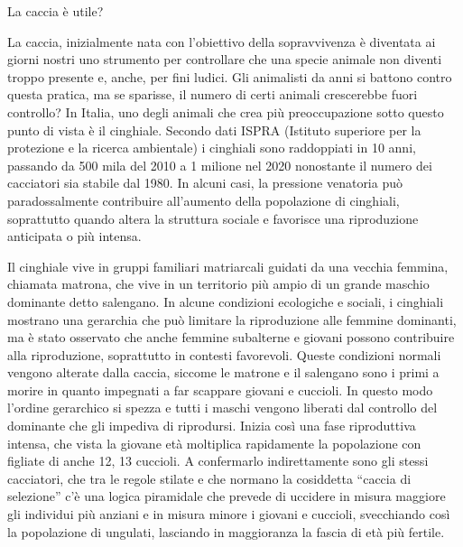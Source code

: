 \documentclass[12pt]{book} %
\begin{document}
\begin{mdframed}[linewidth=1pt]
La caccia è utile?

La caccia, inizialmente nata con l'obiettivo della sopravvivenza è diventata ai giorni nostri uno
strumento per controllare che una specie animale non diventi troppo presente e, anche, per fini ludici. Gli animalisti
da anni si battono contro questa pratica, ma se sparisse, il numero di certi animali crescerebbe fuori controllo? In
Italia, uno degli animali che crea più preoccupazione sotto questo punto di vista è il cinghiale. Secondo
dati ISPRA (Istituto superiore per la protezione e la ricerca ambientale) i cinghiali sono raddoppiati in 10 anni,
passando da 500 mila del 2010 a 1 milione nel 2020 nonostante il numero dei cacciatori sia stabile dal
1980. In alcuni casi, la pressione venatoria può paradossalmente contribuire all’aumento della popolazione di cinghiali, soprattutto quando altera la struttura sociale e favorisce una riproduzione anticipata o più intensa.

Il cinghiale vive in gruppi familiari matriarcali guidati da una vecchia femmina, chiamata matrona, che vive in un
territorio più ampio di un grande maschio dominante detto salengano. In alcune condizioni ecologiche e sociali, i cinghiali mostrano una gerarchia che può limitare la riproduzione alle femmine dominanti, ma è stato osservato che anche femmine subalterne e giovani possono contribuire alla riproduzione, soprattutto in contesti favorevoli.
Queste condizioni normali vengono alterate dalla caccia, siccome le matrone e il salengano sono i primi a morire in
quanto impegnati a far scappare giovani e cuccioli. In questo modo l'ordine gerarchico si spezza e
tutti i maschi vengono liberati dal controllo del dominante che gli impediva di riprodursi. Inizia così una fase
riproduttiva intensa, che vista la giovane età moltiplica rapidamente la popolazione con figliate di anche 12, 13
cuccioli. A confermarlo indirettamente sono gli stessi cacciatori, che tra le regole stilate e che normano la
cosiddetta “caccia di selezione” c'è una logica piramidale che prevede di uccidere in misura maggiore gli individui più
anziani e in misura minore i giovani e cuccioli, svecchiando così la popolazione di ungulati, lasciando in maggioranza
la fascia di età più fertile.


\end{mdframed}
\end{document}
